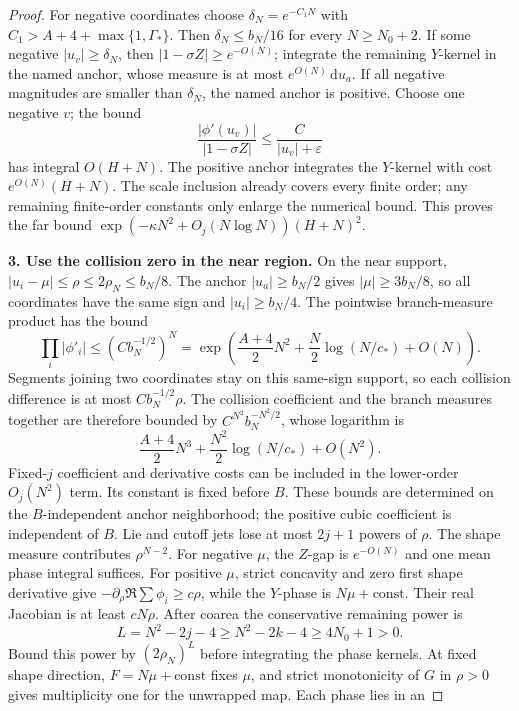 \documentclass[11pt]{article}
\numberwithin{equation}{section}
\theoremstyle{definition}
\newcommand{\dd}{\,\mathrm d}
\newcommand{\eps}{\varepsilon}
\begin{document}
\begin{proof}
For negative coordinates choose \(\delta_N=e^{-C_1N}\) with
\(C_1>A+4+\max\{1,\Gamma_*\}\). Then \(\delta_N\le b_N/16\)
for every \(N\ge N_0+2\). If some negative \(|u_v|\ge\delta_N\), then
\(|1-\sigma Z|\ge e^{-O(N)}\); integrate the remaining \(Y\)-kernel
in the named anchor, whose measure is at most \(e^{O(N)}\dd u_a\).
If all negative magnitudes are smaller than \(\delta_N\), the
named anchor is positive. Choose one negative \(v\); the bound
\[
 \frac{|\phi'(u_v)|}{|1-\sigma Z|}\le\frac C{|u_v|+\eps}
\]
has integral \(O(H+N)\). The positive anchor integrates the
\(Y\)-kernel with cost \(e^{O(N)}(H+N)\).
The scale inclusion already covers every finite order; any
remaining finite-order constants only enlarge the numerical bound.
This proves the far bound
\(\exp(-\kappa N^2+O_j(N\log N))(H+N)^2\).

\par\smallskip\noindent\textbf{3. Use the collision zero in the near region.} On the near support, \(|u_i-\mu|\le\rho\le2\rho_N\le b_N/8\).
The anchor \(|u_a|\ge b_N/2\) gives \(|\mu|\ge3b_N/8\), so
all coordinates have the same sign and \(|u_i|\ge b_N/4\).
The pointwise branch-measure product has the bound
\[
 \prod_i|\phi'_i|\le(Cb_N^{-1/2})^N
 =\exp\left(\frac{A+4}{2}N^2+
             \frac N2\log(N/c_*)+O(N)\right).
\]
Segments joining two coordinates stay on this same-sign support,
so each collision difference is at most \(Cb_N^{-1/2}\rho\).
The collision coefficient and the branch measures together are
therefore bounded by \(C^{N^2}b_N^{-N^2/2}\), whose logarithm is
\[
 \frac{A+4}{2}N^3+\frac{N^2}{2}\log(N/c_*)+O(N^2).
\]
Fixed-\(j\) coefficient and derivative costs can be included in
the lower-order \(O_j(N^2)\) term. Its constant is fixed before
\(B\). These bounds are determined
on the \(B\)-independent anchor neighborhood; the positive cubic
coefficient is independent of \(B\). Lie and cutoff jets lose at most
\(2j+1\) powers of \(\rho\).
The shape measure contributes \(\rho^{N-2}\).
For negative \(\mu\), the \(Z\)-gap is \(e^{-O(N)}\) and one mean
phase integral suffices.
For positive \(\mu\), strict concavity and zero first shape derivative
give \(-\partial_\rho\Re\sum\phi_i\ge c\rho\), while the \(Y\)-phase
is \(N\mu+\mathrm{const}\). Their real Jacobian is at least \(cN\rho\).
After coarea the conservative remaining power is
\[
 L=N^2-2j-4\ge N^2-2k-4\ge4N_0+1>0.
\]
Bound this power by \((2\rho_N)^L\) before integrating the phase
kernels. At fixed shape direction, \(F=N\mu+\mathrm{const}\) fixes
\(\mu\), and strict monotonicity of \(G\) in \(\rho>0\) gives
multiplicity one for the unwrapped map. Each phase lies in an

\end{proof}
\end{document}
